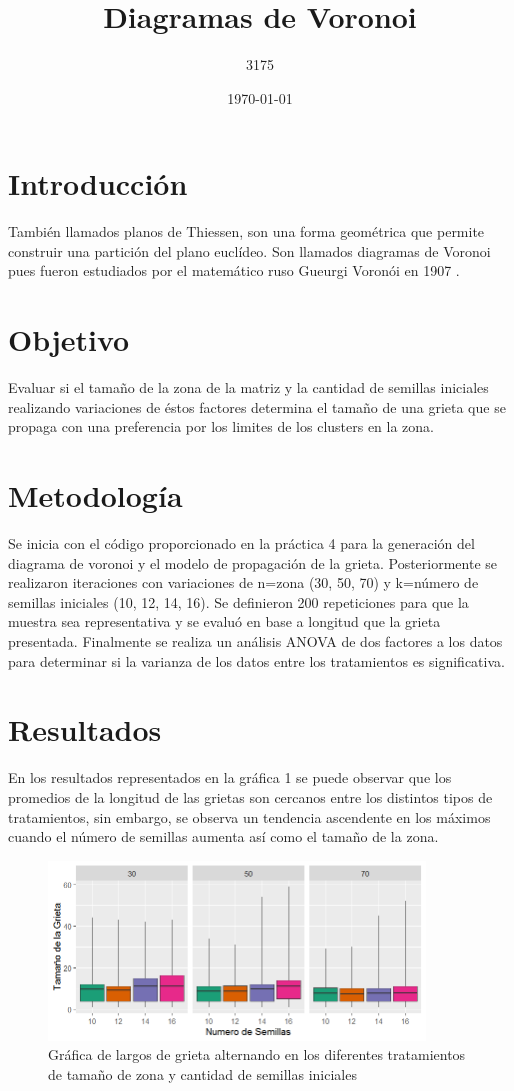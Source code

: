 \documentclass{article}
\author{3175}
\title{Diagramas de Voronoi}
\date{\today}
\begin{document}
\maketitle


\section{Introducción}

También llamados planos de Thiessen, son una forma geométrica que permite construir una partición del plano euclídeo. Son llamados diagramas de Voronoi pues fueron estudiados por el matemático ruso Gueurgi Voronói en 1907 \cite{ref1}.
 
\section{Objetivo}
Evaluar si el tamaño de la zona de la matriz y la cantidad de semillas iniciales realizando variaciones de éstos factores determina el tamaño de una grieta que se propaga con una preferencia por los limites de los clusters en la zona.

\section{Metodología}
Se inicia con el código proporcionado en la práctica 4 \cite{elisawebp4} para la generación del diagrama de voronoi y el modelo de propagación de la grieta. Posteriormente se realizaron iteraciones con variaciones de n=zona (30, 50, 70) y k=número de semillas iniciales (10, 12, 14, 16). Se definieron 200 repeticiones para que la muestra sea representativa y se evaluó en base a longitud que la grieta presentada. Finalmente se realiza un análisis ANOVA de dos factores a los datos para determinar si la varianza de los datos entre los tratamientos es significativa. 

\section{Resultados}
En los resultados representados en la gráfica 1 se puede observar que los promedios de la longitud de las grietas son cercanos entre los distintos tipos de tratamientos, sin embargo, se observa un tendencia ascendente en los máximos cuando el número de semillas aumenta así como el tamaño de la zona.

\begin{figure}[hbtp]
\centering
\includegraphics[width=10cm]{P4_grieta.png}
\caption{Gráfica de largos de grieta alternando en los diferentes tratamientos de tamaño de zona y cantidad de semillas iniciales}
\end{figure}
\end{document}
